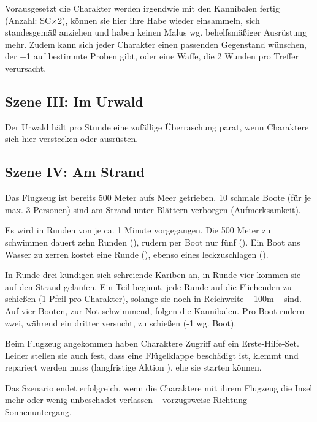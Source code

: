 {		Vorausgesetzt die Charakter werden irgendwie mit den Kannibalen fertig (Anzahl: SC×2), können sie hier ihre Habe wieder einsammeln, sich standesgemäß anziehen und haben keinen Malus wg. behelfsmäßiger Ausrüstung mehr. Zudem kann sich jeder Charakter einen passenden Gegenstand wünschen, der +1 auf bestimmte Proben gibt, oder eine Waffe, die 2 Wunden pro Treffer verursacht.

		\subsection{Szene III: Im Urwald}

		Der Urwald hält pro Stunde eine zufällige Überraschung parat, wenn Charaktere sich hier verstecken oder ausrüsten.


		\subsection{Szene IV: Am Strand }

		Das Flugzeug ist bereits 500 Meter aufs Meer getrieben. 10 schmale Boote (für je max. 3 Personen) sind am Strand unter Blättern verborgen (Aufmerksamkeit).

		Es wird in Runden von je ca. 1 Minute vorgegangen. Die 500 Meter zu schwimmen dauert zehn Runden (), rudern per Boot nur fünf (). Ein Boot ans Wasser zu zerren kostet eine Runde (), ebenso eines leckzuschlagen ().

		In Runde drei kündigen sich schreiende Kariben an, in Runde vier kommen sie auf den Strand gelaufen. Ein Teil beginnt, jede Runde auf die Fliehenden zu schießen (1 Pfeil pro Charakter), solange sie noch in Reichweite -- 100m -- sind. Auf vier Booten, zur Not schwimmend, folgen die Kannibalen. Pro Boot rudern zwei, während ein dritter versucht, zu schießen (-1 wg. Boot).

		Beim Flugzeug angekommen haben Charaktere Zugriff auf ein Erste-Hilfe-Set. Leider stellen sie auch fest, dass eine Flügelklappe beschädigt ist, klemmt und repariert werden muss (langfristige Aktion ), ehe sie starten können.


		\noindent
		Das Szenario endet erfolgreich, wenn die Charaktere mit ihrem Flugzeug die Insel mehr oder wenig unbeschadet verlassen -- vorzugsweise Richtung Sonnenuntergang.
}
